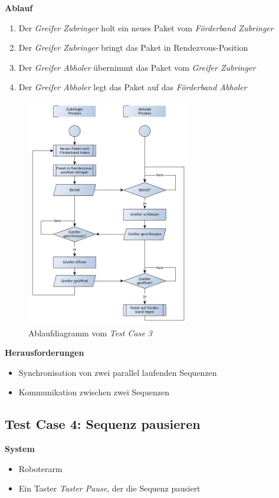 \textbf{Ablauf}
\begin{enumerate}
\item Der \textit{Greifer Zubringer} holt ein neues Paket vom \textit{Förderband Zubringer}
\item Der \textit{Greifer Zubringer} bringt das Paket in Rendezvous-Position
\item Der \textit{Greifer Abholer} übernimmt das Paket vom \textit{Greifer Zubringer} 
\item Der \textit{Greifer Abholer} legt das Paket auf das \textit{Förderband Abholer}
\end{enumerate}

\begin{figure}[]
\centering
\includegraphics[angle=0,height=10cm]{images/Testcase03.png}
\caption{Ablaufdiagramm vom \textit{Test Case 3}}
\label{Testcase03Picture}
\end{figure}

\textbf{Herausforderungen}
\begin{itemize}
\item Synchronisation von zwei parallel laufenden Sequenzen
\item Kommunikation zwischen zwei Sequenzen
\end{itemize}


\subsection{Test Case 4: Sequenz pausieren}
\textbf{System}
\begin{itemize}
\item Roboterarm
\item Ein Taster \textit{Taster Pause}, der die Sequenz pausiert
\end{itemize}

